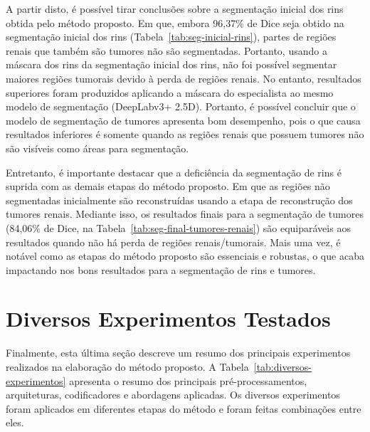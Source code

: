 A partir disto, é possível tirar conclusões sobre a segmentação inicial dos rins obtida pelo método proposto. Em que, embora 96,37\% de Dice seja obtido na segmentação inicial dos rins (Tabela~\ref{tab:seg-inicial-rins}), partes de regiões renais que também são tumores não são segmentadas. Portanto, usando a máscara dos rins da segmentação inicial dos rins, não foi possível segmentar maiores regiões tumorais devido à perda de regiões renais. No entanto, resultados superiores foram produzidos aplicando a máscara do especialista ao mesmo modelo de segmentação (DeepLabv3+ 2.5D). Portanto, é possível concluir que o modelo de segmentação de tumores apresenta bom desempenho, pois o que causa resultados inferiores é somente quando as regiões renais que possuem tumores não são visíveis como áreas para segmentação.

Entretanto, é importante destacar que a deficiência da segmentação de rins é suprida com as demais etapas do método proposto. Em que as regiões não segmentadas inicialmente são reconstruídas usando a etapa de reconstrução dos tumores renais. Mediante isso, os resultados finais para a segmentação de tumores (84,06\% de Dice, na Tabela~\ref{tab:seg-final-tumores-renais}) são equiparáveis aos resultados quando não há perda de regiões renais/tumorais. Mais uma vez, é notável como as etapas do método proposto são essenciais e robustas, o que acaba impactando nos bons resultados para a segmentação de rins e tumores.


\section{Diversos Experimentos Testados}
\label{sec:experimentos-testados}

Finalmente, esta última seção descreve um resumo dos principais experimentos realizados na elaboração do método proposto. A Tabela~\ref{tab:diversos-experimentos} apresenta o resumo dos principais pré-processamentos, arquiteturas, codificadores e abordagens aplicadas. Os diversos experimentos foram aplicados em diferentes etapas do método e foram feitas combinações entre eles.


